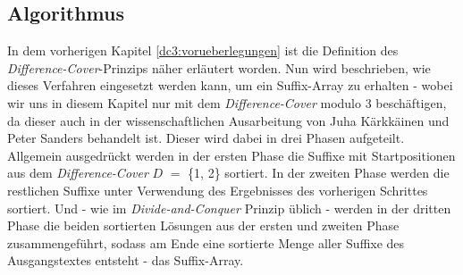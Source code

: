 \subsection{Algorithmus}
\label{dc3:algorithmus}

In dem vorherigen Kapitel \ref{dc3:vorueberlegungen} ist die Definition des \emph{Difference-Cover}-Prinzips näher erläutert worden. Nun wird beschrieben, wie dieses Verfahren eingesetzt werden kann, um ein Suffix-Array zu erhalten - wobei wir uns in diesem Kapitel nur mit dem \emph{Difference-Cover} modulo $3$ beschäftigen, da dieser auch in der wissenschaftlichen Ausarbeitung von Juha Kärkkäinen und Peter Sanders behandelt ist. Dieser wird dabei in drei Phasen aufgeteilt. Allgemein ausgedrückt werden in der ersten Phase die Suffixe mit Startpositionen aus dem \emph{Difference-Cover} \(D\) $=$ \{1, 2\} sortiert. In der zweiten Phase werden die restlichen Suffixe unter Verwendung des Ergebnisses des vorherigen Schrittes sortiert. Und - wie im \emph{Divide-and-Conquer} Prinzip üblich - werden in der dritten Phase die beiden sortierten Lösungen aus der ersten und zweiten Phase zusammengeführt, sodass am Ende eine sortierte Menge aller Suffixe des Ausgangstextes entsteht - das Suffix-Array.





